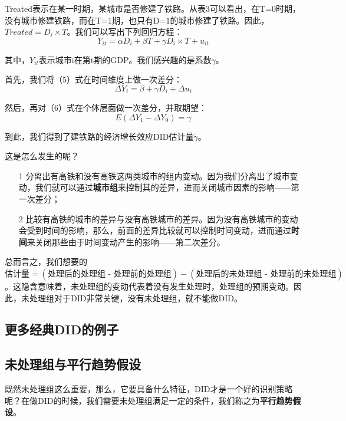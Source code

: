\documentclass[cn,10pt,math=newtx,citestyle=gb7714-2015,bibstyle=gb7714-2015]{elegantbook}
\begin{document}
	Treated表示在某一时期，某城市是否修建了铁路。从表3可以看出，在T=0时期，没有城市修建铁路，而在T=1期，也只有D=1的城市修建了铁路。因此，$Treated=D_i\times{T}$。我们可以写出下列回归方程：
	\begin{equation}
		Y_{it}=\alpha{D}_i+\beta{T}+\gamma{D_i\times{T}}+u_{it}
	\end{equation}
	
	其中，$Y_{it}$表示城市i在第t期的GDP。我们感兴趣的是系数$\gamma$。
	
	首先，我们将（5）式在时间维度上做一次差分：
	\begin{equation}
		\Delta{Y}_i=\beta+\gamma{D}_i+\Delta{u}_i
	\end{equation}
	
	然后，再对（6）式在个体层面做一次差分，并取期望：
	\begin{equation}
		E(\Delta{Y}_1-\Delta{Y}_0)=\gamma
	\end{equation}
	
	到此，我们得到了建铁路的经济增长效应DID估计量$\tilde{\gamma}$。
	
	这是怎么发生的呢？
	
	\begin{itemize}
		\item [1] 分离出有高铁和没有高铁这两类城市的组内变动。因为我们分离出了城市变动，我们就可以通过\textbf{城市组}来控制其的差异，进而关闭城市因素的影响——第一次差分；
		\item [2] 比较有高铁的城市的差异与没有高铁城市的差异。因为没有高铁城市的变动会受到时间的影响，那么，前面的差异比较就可以控制时间变动，进而通过\textbf{时间}来关闭那些由于时间变动产生的影响——第二次差分。
	\end{itemize}

    总而言之，我们想要的$\text{估计量} = (\text{处理后的处理组 - 处理前的处理组}) - (\text{处理后的未处理组 - 处理前的未处理组})$。这隐含意味着，未处理组的变动代表着没有发生处理时，处理组的预期变动。因此，未处理组对于DID非常关键，没有未处理组，就不能做DID。
	
	
	\subsection{更多经典DID的例子}
	
	
	
	\subsection{未处理组与平行趋势假设}
	
	既然未处理组这么重要，那么，它要具备什么特征，DID才是一个好的识别策略呢？在做DID的时候，我们需要未处理组满足一定的条件，我们称之为\textbf{平行趋势假设}。
	
\end{document}
